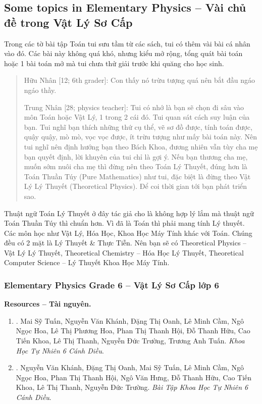 \documentclass[12pt,oneside]{book}
\begin{document}

\subsection{Some topics in Elementary Physics -- Vài chủ đề trong Vật Lý Sơ Cấp}
Trong các tờ bài tập Toán tui sưu tầm từ các sách, tui có thêm vài bài cá nhân vào đó. Các bài này không quá khó, nhưng kiểu mở rộng, tổng quát bài toán hoặc 1 bài toán mở mà tui chưa thử giải trước khi quăng cho học sinh.

\begin{quote}
	{\sf Hữu Nhân [12; 6th grader]}: Con thấy nó trừu tượng quá nên bắt đầu ngáo ngáo thầy.
	\vspace{2mm}
	
	{\sf Trung Nhân [28; physics teacher]}: Tui có nhớ là bạn sẽ chọn đi sâu vào môn Toán hoặc Vật Lý, 1 trong 2 cái đó. Tui quan sát cách suy luận của bạn. Tui nghĩ bạn thích những thứ cụ thể, vẽ sơ đồ được, tính toán được, quậy quậy, mò mò, vọc vọc được, ít trừu tượng như mấy bài toán này. Nên tui nghĩ nên định hướng bạn theo Bách Khoa, đương nhiên vẫn tùy cha mẹ bạn quyết định, lời khuyên của tui chỉ là gợi ý. Nếu bạn thương cha mẹ, muốn sớm nuôi cha mẹ thì đừng nên theo Toán Lý Thuyết, đúng hơn là Toán Thuần Túy (Pure Mathematics) như tui, đặc biệt là đừng theo Vật Lý Lý Thuyết (Theoretical Physics). Để coi thời gian tới bạn phát triển sao.
\end{quote}
Thuật ngữ Toán Lý Thuyết ở đây tác giả cho là không hợp lý lắm mà thuật ngữ Toán Thuần Túy thì chuẩn hơn. Vì đã là Toán thì phải mang tính Lý thuyết. Các môn học như Vật Lý, Hóa Học, Khoa Học Máy Tính khác với Toán. Chúng đều có 2 mặt là Lý Thuyết \& Thực Tiễn. Nên bạn sẽ có Theoretical Physics -- Vật Lý Lý Thuyết, Theoretical Chemistry -- Hóa Học Lý Thuyết, Theoretical Computer Science -- Lý Thuyết Khoa Học Máy Tính.

\subsubsection{Elementary Physics Grade 6 -- Vật Lý Sơ Cấp lớp 6}
\textbf{\textsf{Resources -- Tài nguyên.}}
\begin{enumerate}
	\item \cite{SGK_KHTN_6_CD}. {\sc Mai Sỹ Tuấn, Nguyễn Văn Khánh, Đặng Thị Oanh, Lê Minh Cầm, Ngô Ngọc Hoa, Lê Thị Phương Hoa, Phan Thị Thanh Hội, Đỗ Thanh Hữu, Cao Tiến Khoa, Lê Thị Thanh, Nguyễn Đức Trường, Trương Anh Tuấn}. {\it Khoa Học Tự Nhiên 6 Cánh Diều}.
	
	\item \cite{SBT_KHTN_6_CD}. {\sc Nguyễn Văn Khánh, Đặng Thị Oanh, Mai Sỹ Tuấn, Lê Minh Cầm, Ngô Ngọc Hoa, Phan Thị Thanh Hội, Ngô Văn Hưng, Đỗ Thanh Hữu, Cao Tiến Khoa, Lê Thị Thanh, Nguyễn Đức Trường}. {\it Bài Tập Khoa Học Tự Nhiên 6 Cánh Diều}.
\end{enumerate}
\end{document}

